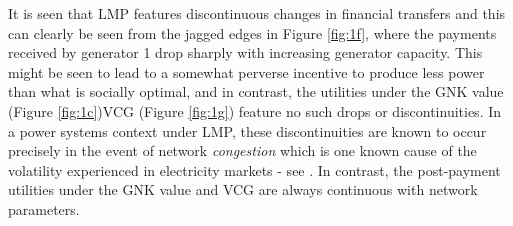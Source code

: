 It is seen that LMP features discontinuous changes in financial transfers and this can clearly be seen from the jagged edges in Figure \ref{fig:1f}, where the payments received by generator 1 drop sharply with increasing generator capacity.
This \DIFaddbegin {}\DIFaddend might be seen to lead to a somewhat perverse incentive to produce less power than what is socially optimal, and in contrast, the utilities under the GNK value (Figure \ref{fig:1c})\DIFdelbegin {}\DIFdelend \DIFaddbegin \DIFadd{, }\DIFaddend VCG (Figure \ref{fig:1g}) \DIFaddbegin {}\DIFaddend feature no such drops or discontinuities.
In a power systems context under LMP, these discontinuities are known to occur precisely in the event of network \emph{congestion}
which is one known cause of the volatility experienced in electricity markets - see \cite{RePEc:aen:journl:2006v27-02-a09}. 
In contrast, the post-payment utilities under the GNK value and VCG are \DIFdelbegin {}\DIFdelend always continuous with network parameters.



